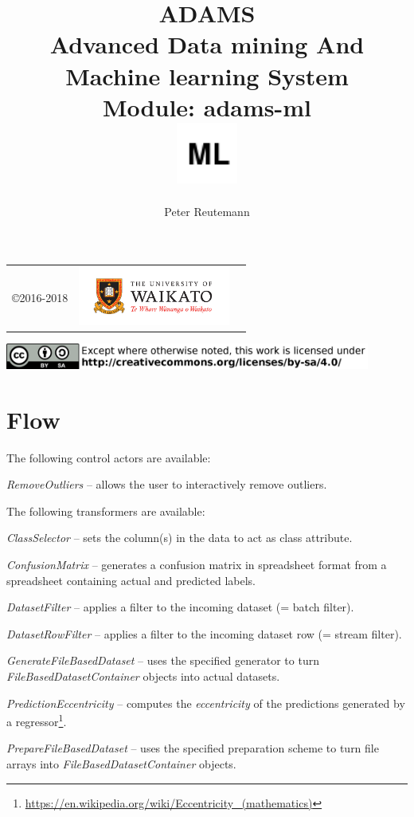 \documentclass[a4paper]{book}
\title{
  \textbf{ADAMS} \\
  {\Large \textbf{A}dvanced \textbf{D}ata mining \textbf{A}nd \textbf{M}achine
  learning \textbf{S}ystem} \\
  {\Large Module: adams-ml} \\
  \vspace{1cm}
  \includegraphics[width=2cm]{images/ml-module.png} \\
}
\author{
  Peter Reutemann
}
\begin{document}
\begin{titlepage}
\maketitle

\thispagestyle{empty}
\center
\begin{table}[b]
	\begin{tabular}{c l l}
		\parbox[c][2cm]{2cm}{\copyright 2016-2018} &
		\parbox[c][2cm]{5cm}{\includegraphics[width=5cm]{images/coat_of_arms.pdf}}
	\end{tabular}
	\includegraphics[width=12cm]{images/cc.png} \\
\end{table}

\end{titlepage}

\tableofcontents

\chapter{Flow}

The following control actors are available:
\begin{tight_itemize}
  \item \textit{RemoveOutliers} -- allows the user to interactively remove
  outliers.
\end{tight_itemize}

The following transformers are available:
\begin{tight_itemize}
  \item \textit{ClassSelector} -- sets the column(s) in the data to act as
  class attribute.
  \item \textit{ConfusionMatrix} -- generates a confusion matrix in spreadsheet
  format from a spreadsheet containing actual and predicted labels.
  \item \textit{DatasetFilter} -- applies a filter to the incoming dataset (= batch filter).
  \item \textit{DatasetRowFilter} -- applies a filter to the incoming dataset row (= stream filter).
  \item \textit{GenerateFileBasedDataset} -- uses the specified generator to turn \textit{FileBasedDatasetContainer}
  objects into actual datasets.
  \item \textit{PredictionEccentricity} -- computes the \textit{eccentricity}
  of the predictions generated by a regressor\footnote{\url{https://en.wikipedia.org/wiki/Eccentricity_(mathematics)}{}}.
  \item \textit{PrepareFileBasedDataset} -- uses the specified preparation scheme to turn file arrays into
  \textit{FileBasedDatasetContainer} objects.
\end{tight_itemize}
\end{document}
